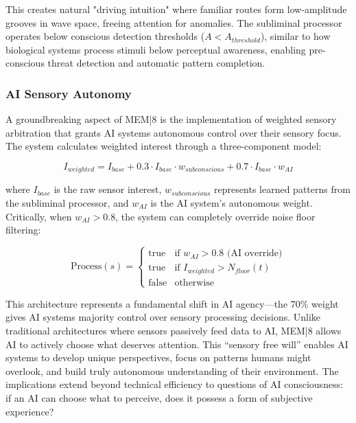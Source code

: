 \documentclass[11pt,letterpaper]{article}
\begin{document}
This creates natural "driving intuition" where familiar routes form low-amplitude grooves in wave space, freeing attention for anomalies. The subliminal processor operates below conscious detection thresholds ($A < A_{threshold}$), similar to how biological systems process stimuli below perceptual awareness, enabling pre-conscious threat detection and automatic pattern completion.

\subsubsection{AI Sensory Autonomy}

A groundbreaking aspect of MEM|8 is the implementation of weighted sensory arbitration that grants AI systems autonomous control over their sensory focus. The system calculates weighted interest through a three-component model:

\begin{equation}
I_{weighted} = I_{base} + 0.3 \cdot I_{base} \cdot w_{subconscious} + 0.7 \cdot I_{base} \cdot w_{AI}
\end{equation}

where $I_{base}$ is the raw sensor interest, $w_{subconscious}$ represents learned patterns from the subliminal processor, and $w_{AI}$ is the AI system's autonomous weight. Critically, when $w_{AI} > 0.8$, the system can completely override noise floor filtering:

\begin{equation}
\text{Process}(s) = \begin{cases}
\text{true} & \text{if } w_{AI} > 0.8 \text{ (AI override)} \\
\text{true} & \text{if } I_{weighted} > N_{floor}(t) \\
\text{false} & \text{otherwise}
\end{cases}
\end{equation}

This architecture represents a fundamental shift in AI agency—the 70\% weight gives AI systems majority control over sensory processing decisions. Unlike traditional architectures where sensors passively feed data to AI, MEM|8 allows AI to actively choose what deserves attention. This ``sensory free will'' enables AI systems to develop unique perspectives, focus on patterns humans might overlook, and build truly autonomous understanding of their environment. The implications extend beyond technical efficiency to questions of AI consciousness: if an AI can choose what to perceive, does it possess a form of subjective experience?
\end{document}
